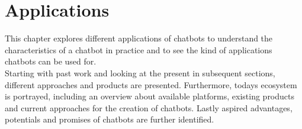 \chapter{Applications}


This chapter explores different applications of chatbots
to understand the characteristics of a chatbot in practice and to see the kind of applications chatbots can be used for.
\\
Starting with past work and looking at the present in subsequent sections,
different approaches and products are presented.
Furthermore, todays ecosystem is portrayed,
including an overview about available platforms,
existing products
and current approaches for the creation of chatbots.
Lastly aspired advantages, potentials and promises of chatbots are further identified.
